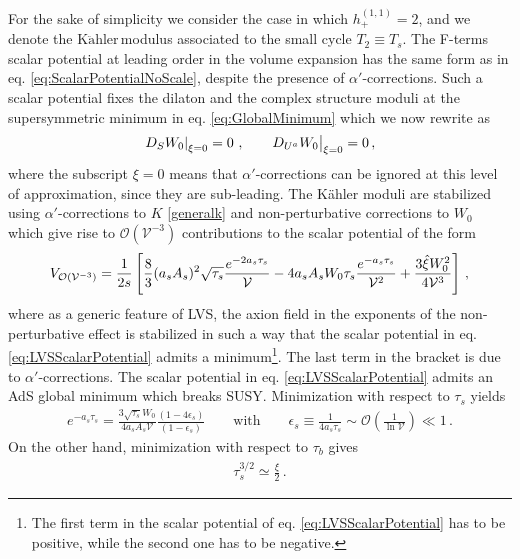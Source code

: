 \documentclass[12pt,a4paper]{book}
\newcommand{\Kahler}{\ensuremath{\text{K}\ddot{\text{a}}\text{hler}\,}}
\newcommand{\mc}{\mathcal}
\newcommand{\V}{{\cal{V}}}
\begin{document}
For the sake of simplicity we consider the case in which $h^{(1,1)}_+ = 2$, and we denote the \Kahler modulus associated to the small cycle $T_2 \equiv T_s$. The F-terms scalar potential at leading order in the volume expansion has the same form as in eq. \eqref{eq:ScalarPotentialNoScale}, despite the presence of $\alpha'$-corrections. Such a scalar potential fixes the dilaton and the complex structure moduli at the supersymmetric minimum in eq. \eqref{eq:GlobalMinimum} which we now rewrite as
\begin{align}
\label{susyminim}
\left.D_S W_0\right|_{\xi  = 0} = 0\ , \qquad D_{U^a} W_0 \big{|}_{\xi = 0} = 0\, ,
\end{align}
where the subscript $\xi = 0$ means that $\alpha'$-corrections can be ignored at this level of approximation, since they are sub-leading. The K\"ahler moduli are stabilized using $\alpha'$-corrections to $K$ \eqref{generalk} and non-perturbative corrections to $W_0$ which give rise to $\mc{O}(\mathcal{V}^{-3})$ contributions to the scalar potential of the form
\begin{align}
\label{eq:LVSScalarPotential}
V_{\mathcal{O}\left(\V^{-3}\right)} = \frac{1}{2 s} \left[\frac{8}{3}(a_s A_s)^2 \sqrt{\tau_s} \frac{e^{- 2 a_s \tau_s}}{\mathcal{V}}
- 4 a_s A_s W_0 	\tau_s \frac{e^{-a_s \tau_s}}{\mathcal{V}^2 } + \frac{3\hat\xi W_0^2}{4\mathcal{V}^3}\right]\, ,
\end{align}
where as a generic feature of LVS, the axion field in the exponents of the non-perturbative effect is stabilized in such a way that the scalar potential in eq. \eqref{eq:LVSScalarPotential} admits a minimum\footnote{The first term in the scalar potential of eq. \eqref{eq:LVSScalarPotential} has to be positive, while the second one has to be negative.}. The last term in the bracket is due to $\alpha'$-corrections. The scalar potential in eq. \eqref{eq:LVSScalarPotential} admits an AdS global minimum which breaks SUSY. Minimization with respect to $\tau_s$ yields
\begin{align}
e^{- a_s \tau_s} = \frac{3 \sqrt{\tau_s} W_0}{4 a_s A_s \mathcal{V}} \frac{\left(1-4\epsilon_s\right)}{\left(1-\epsilon_s\right)}\qquad\text{with}\qquad \epsilon_s \equiv\frac{1}{4 a_s \tau_s}\sim\mc{O}\left(\frac{1}{\ln\mathcal{V}}\right)\ll 1\,.
\label{eq:TaubMinimum}
\end{align}
On the other hand, minimization with respect to $\tau_b$ gives
\begin{align}
\tau_s^{3/2} \simeq \frac{\hat\xi}{2}\,.
\label{eq:TausMinimum}
\end{align}
\end{document}
